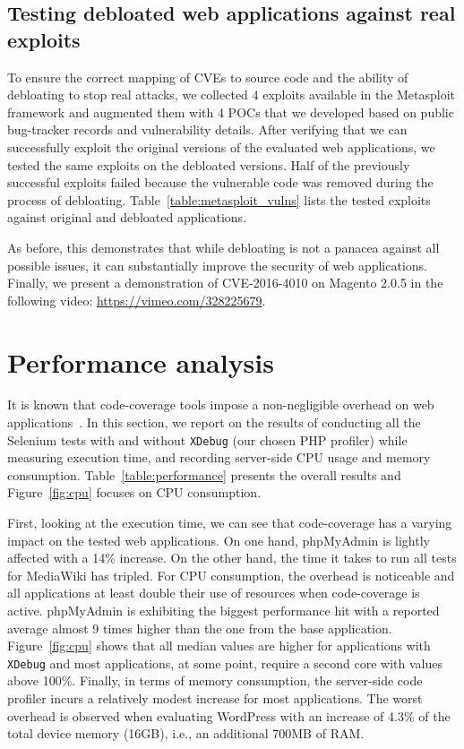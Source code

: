\subsection{Testing debloated web applications against real exploits}
\label{section:metasploit}
To ensure the correct mapping of CVEs to source code and the ability of debloating to stop real attacks, we collected 4 exploits available in the Metasploit framework and augmented them with 4 POCs that we developed based on public bug-tracker records and vulnerability details. After verifying that we can successfully exploit the original versions of the evaluated web applications, we tested the same exploits on the debloated versions. Half of the previously successful exploits failed because the vulnerable code was removed during the process of debloating. Table~\ref{table:metasploit_vulns} lists the tested exploits against original and debloated applications.

As before, this demonstrates that while debloating is not a panacea against all possible issues, it can substantially improve the security of web applications. Finally, we present a demonstration of CVE-2016-4010 on Magento 2.0.5 in the following video: \url{https://vimeo.com/328225679}.

\section{Performance analysis}
\label{subsection:performance}
It is known that code-coverage tools impose a non-negligible overhead on web applications~\cite{xdebug-performance1}. In this section, we report on the results of conducting all the Selenium tests with and without \texttt{XDebug} (our chosen PHP profiler) while measuring execution time, and recording server-side CPU usage and memory consumption. Table~\ref{table:performance} presents the overall results and Figure~\ref{fig:cpu} focuses on CPU consumption.

First, looking at the execution time, we can see that code-coverage has a
varying impact on the tested web applications.
On one hand, phpMyAdmin is lightly affected with a 14\% increase.
On the other hand, the time it takes to run all tests for MediaWiki has
tripled.
For CPU consumption, the overhead is noticeable and all applications at
least double their use of resources when code-coverage is active.
phpMyAdmin is exhibiting the biggest performance hit with a reported
average almost 9 times higher than the one from the base application.
Figure~\ref{fig:cpu} shows that all median values are higher for applications
with \texttt{XDebug} and most applications, at some point, require a second
core with values above 100\%. Finally, in terms of memory consumption,
the server-side code profiler incurs a relatively modest increase for most
applications. The worst overhead is observed when evaluating WordPress with
an increase of 4.3\% of the total device memory (16GB), i.e., an additional
700MB of RAM.

